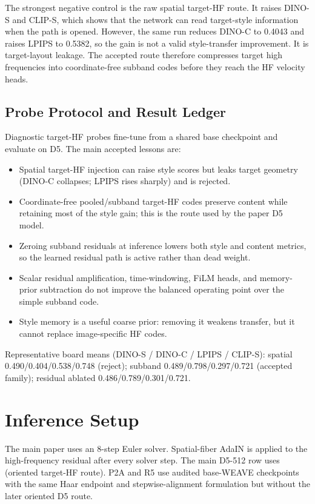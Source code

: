 \documentclass[letterpaper]{article}
\newcommand{\dinos}{DINO-S}
\newcommand{\dinoc}{DINO-C}
\newcommand{\clips}{CLIP-S}
\begin{document}
The strongest negative control is the raw spatial target-HF route. It raises \dinos{}
and \clips{}, which shows that the network can read target-style information when the
path is opened. However, the same run reduces \dinoc{} to 0.4043 and raises LPIPS to
0.5382, so the gain is not a valid style-transfer improvement. It is target-layout
leakage. The accepted route therefore compresses target high frequencies into
coordinate-free subband codes before they reach the HF velocity heads.

\subsection{Probe Protocol and Result Ledger}

Diagnostic target-HF probes fine-tune from a shared base checkpoint and evaluate on D5.
The main accepted lessons are:

\begin{itemize}[leftmargin=1.5em,itemsep=0.2em]
  \item Spatial target-HF injection can raise style scores but leaks target geometry
  (DINO-C collapses; LPIPS rises sharply) and is rejected.
  \item Coordinate-free pooled/subband target-HF codes preserve content while retaining
  most of the style gain; this is the route used by the paper D5 model.
  \item Zeroing subband residuals at inference lowers both style and content metrics, so
  the learned residual path is active rather than dead weight.
  \item Scalar residual amplification, time-windowing, FiLM heads, and memory-prior
  subtraction do not improve the balanced operating point over the simple subband code.
  \item Style memory is a useful coarse prior: removing it weakens transfer, but it cannot
  replace image-specific HF codes.
\end{itemize}

Representative board means (DINO-S / DINO-C / LPIPS / CLIP-S): spatial 0.490/0.404/0.538/0.748
(reject); subband 0.489/0.798/0.297/0.721 (accepted family); residual ablated 0.486/0.789/0.301/0.721.

\section{Inference Setup}

The main paper uses an 8-step Euler solver. Spatial-fiber AdaIN is applied to the
high-frequency residual after every solver step. The main D5-512 row uses
 (oriented target-HF
route). P2A and R5 use audited base-WEAVE checkpoints with the same Haar endpoint and
stepwise-alignment formulation but without the later oriented D5 route.
\end{document}
